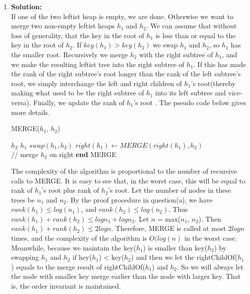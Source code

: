 \begin{enumerate}[label=(\alph*)]
	\item \textbf{Solution:} \\
	If one of the two leftist heap is empty, we are done. Otherwise we want to merge two non-empty leftist heaps $h_1$ and $h_2$. We can assume that without loss of generality, that the key in the root of $h_1$ is less than or equal to the key in the root of $h_2$. If $key(h_1) > key(h_2)$ we swap $h_1$ and $h_2$, so $h_1$ has the smaller root. Recursively we merge $h_2$ with the right subtree of $h_1$, and we make the resulting leftist tree into the right subtree of $h_1$. If this has made the rank of the right subtree's root longer than the rank of the left subtree's root, we simply interchange the left and right children of $h_1$'s root(thereby making what used to be the right subtree of $h_1$ into its left subtree and vice-versa). Finally, we update the rank of $h_1$'s root . The pseudo code below gives more details. 
	\begin{algorithm}
	\caption{MERGE($h_1$, $h_2$)}\label{euclid}
	\begin{algorithmic}
	 \Return $h_2$
	 \Return $h_1$
	\Else
		\State $swap(h_1, h_2)$
		\EndIf
		$right(h_1) \gets MERGE(right(h_1), h_2) $ \\
		// merge $h_2$ on right 
	\EndIf
	\State \textbf{end} MERGE
	\end{algorithmic}
	\end{algorithm}
	The complexity of the algorithm is proportional to the number of recursive calls to MERGE.  It is easy to see that, in the worst case, this will be equal to rank of $h_1$'s root plus rank of $h_2$'s root. Let the number of nodes in these trees be $n_1$ and $n_2$. By the proof procedure in question(a), we have $rank(h_1) \leq log(n_1)$, and $rank(h_2) \leq log(n_2)$. Thus $rank(h_1) + rank(h_2) \leq logn_1 + logn_2$. Let $n$ = max($n_1$, $n_2$). Then $rank(h_1) + rank(h_2) \leq 2logn$. Therefore, MERGE is called at most $2logn$ times, and the complexity of the algorithm is $O(log(n)$ in the worst case. \\
	Meanwhile, because we maintain the key($h_1$) is smaller than key($h_2$) by swapping $h_1$ and $h_2$ if hey($h_1$) < key($h_2$) and then we let the rightChildOf($h_1$) equals to the merge result of rightChildOf($h_1$) and $h_2$. So we will always let the node with smaller key merge earlier than the node with larger key. That is, the order invariant is maintained. 


\end{enumerate}
